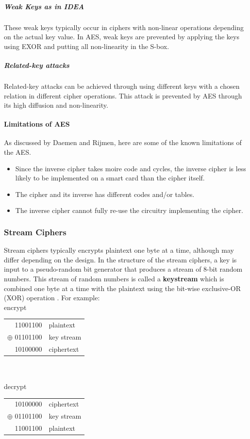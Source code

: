 \documentclass{article}
\begin{document}
\subparagraph{Weak Keys as in IDEA}
These weak keys typically occur in ciphers with non-linear operations depending on the actual key value. In AES, weak keys are prevented by applying the keys using EXOR and putting all non-linearity in the S-box.

\subparagraph{Related-key attacks}
Related-key attacks can be achieved through using different keys with a chosen relation in different cipher operations. This attack is prevented by AES through its high diffusion and non-linearity.

\paragraph{Limitations of AES}
As discussed by Daemen and Rijmen\cite{daemen1999}, here are some of the known limitations of the AES.
\begin{itemize}
\item Since the inverse cipher takes moire code and cycles, the inverse cipher is less likely to be implemented on a smart card than the cipher itself.
\item The cipher and its inverse has different codes and/or tables.
\item The inverse cipher cannot fully re-use the circuitry implementing the cipher.
\end{itemize}

\subsubsection{Stream Ciphers}
Stream ciphers typically encrypts plaintext one byte at a time, although may differ depending on the design. In the structure of the stream ciphers, a key is input to a pseudo-random bit generator that produces a stream of 8-bit random numbers. This stream of random numbers is called a \textbf{keystream} which is combined one byte at a time with the plaintext using the bit-wise exclusive-OR (XOR) operation \cite{stallings2011}. For example:
\\

encrypt
\begin{tabular}{r l}
11001100 & plaintext\\
$\oplus$ 01101100 & key stream\\
\hline
10100000 & ciphertext
\end{tabular}
\\
\\

decrypt
\begin{tabular}{r l}
10100000 & ciphertext\\
$\oplus$ 01101100 & key stream\\
\hline
11001100 & plaintext
\end{tabular}
\\
\end{document}
